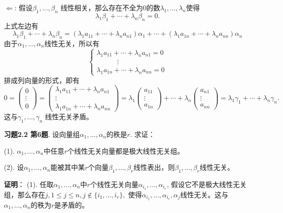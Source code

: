 $\Longleftarrow$: 假设$\beta_1, \ldots, \beta_n$ 线性相关，那么存在不全为0的数$\lambda_1, \ldots, \lambda_n$使得
$$\lambda_1 \beta_1 + \cdots + \lambda_n \beta_n = 0.$$
上式左边有
$$\lambda_1 \beta_1 + \cdots + \lambda_n \beta_n = (\lambda_1 a_{11} + \cdots + \lambda_n a_{n1}) \alpha_1 + \cdots + (\lambda_1 a_{1n} + \cdots + \lambda_n a_{nn}) \alpha_n$$
由于$\alpha_1, \ldots, \alpha_n$线性无关，所以有
$$
\begin{cases}
\lambda_1 a_{11} + \cdots + \lambda_n a_{n1} = 0\\
\hspace{3em} \vdots \\
\lambda_1 a_{1n} + \cdots + \lambda_n a_{nn} = 0
\end{cases}
$$
排成列向量的形式，即有
$$0 = \begin{pmatrix} 0 \\ \vdots \\ 0 \end{pmatrix} = \begin{pmatrix} \lambda_1 a_{11} + \cdots + \lambda_n a_{n1} \\ \vdots \\ \lambda_1 a_{1n} + \cdots + \lambda_n a_{nn} \end{pmatrix} = \lambda_1 \begin{pmatrix} a_{11} \\ \vdots \\ a_{1n} \end{pmatrix} + \cdots + \lambda_n \begin{pmatrix} a_{n1} \\ \vdots \\ a_{nn} \end{pmatrix} = \lambda_1 \gamma_1 + \cdots + \lambda_n \gamma_n.$$
这与$\gamma_1, \ldots, \gamma_n$ 线性无关矛盾。

\newpageorvspace

{\bf 习题2.2 第6题}. 设向量组$\alpha_1, \ldots, \alpha_n$的秩是$r.$ 求证：

(1). $\alpha_1, \ldots, \alpha_n$中任意$r$个线性无关向量都是极大线性无关组。

(2). 设$\alpha_1, \ldots, \alpha_n$能被其中某$r$个向量$\beta_1, \ldots, \beta_r$线性表出，则$\beta_1, \ldots, \beta_r$线性无关。

\newpageorvspace

{\bf 证明}： (1). 任取$\alpha_1, \ldots, \alpha_n$中$r$个线性无关向量$\alpha_{i_1}, \ldots, \alpha_{i_r}$, 假设它不是极大线性无关组，那么存在$j, 1\leqslant j \leqslant n, j\not\in \{i_1, \ldots, i_r \},$ 使得$\alpha_{i_1}, \ldots, \alpha_{i_r}, \alpha_j$线性无关。这与$\alpha_1, \ldots, \alpha_n$的秩为$r$是矛盾的。

